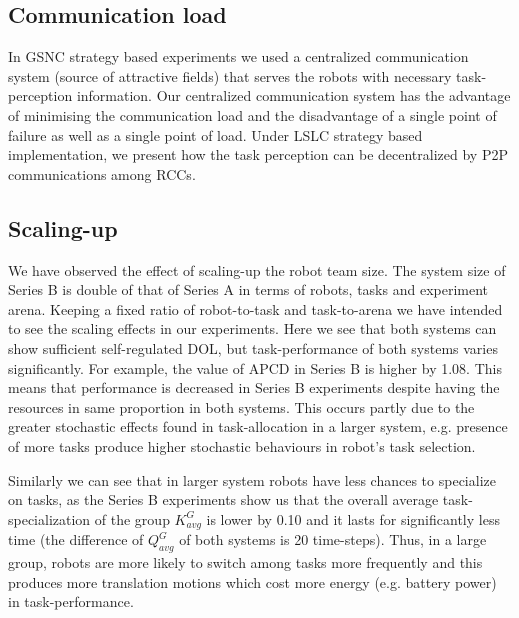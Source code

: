 \documentclass[journal]{IEEEtran}
\begin{document}
\subsection{Communication load}
In GSNC strategy based experiments we used a centralized communication system (source of attractive fields) that serves the robots with necessary task-perception information.  Our centralized communication system has the advantage of minimising the communication load and the disadvantage of a single point of failure as well as a single point of load. Under LSLC strategy based implementation, we present how the task perception can be decentralized by P2P communications among RCCs.
\subsection{Scaling-up}
We have observed the effect of scaling-up the robot team size. The system size of Series B is double of that of Series A in terms of robots, tasks and experiment arena. Keeping a fixed ratio of robot-to-task and task-to-arena we have intended to see the scaling effects in our experiments. Here we see that both systems can show sufficient self-regulated DOL, but task-performance of both systems varies significantly. For example, the value of APCD in Series B is higher by 1.08. This means that performance  is decreased in Series B experiments despite having the resources in same proportion in both systems. This occurs partly due to the greater stochastic effects found in task-allocation in a larger system, e.g. presence of more tasks produce higher stochastic behaviours in robot's task selection.

Similarly we can see that in larger system robots have less chances to specialize on tasks, as the Series B experiments show us that the overall average task-specialization of the group $K^G_{avg}$ is lower by 0.10 and it lasts for significantly less time (the difference of $Q^G_{avg}$  of both systems is 20 time-steps). Thus, in a large group, robots are more likely to switch among tasks more frequently and this produces more translation motions which cost more energy (e.g. battery power) in task-performance.
\end{document}
